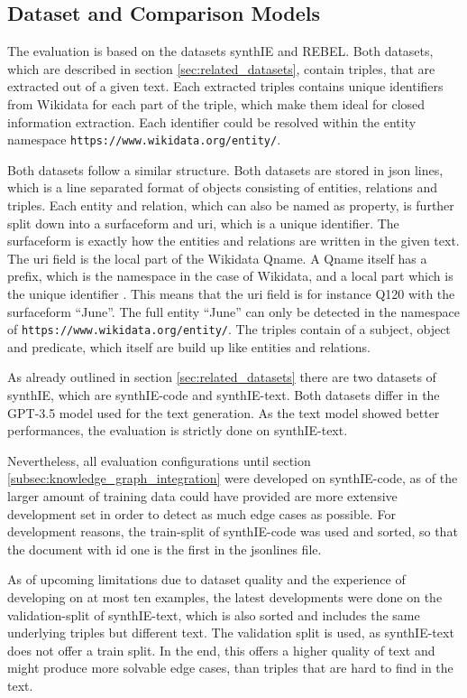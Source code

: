 \documentclass[a4paper,oneside,bibliography=totoc]{scrbook}
\begin{document}
\subsection{Dataset and Comparison Models}
\label{sec:dataset}

The evaluation is based on the datasets synthIE and REBEL. Both datasets, which are described in section \ref{sec:related_datasets}, contain triples, that are extracted out of a given text. Each extracted triples contains unique identifiers from Wikidata for each part of the triple, which make them ideal for closed information extraction. Each identifier could be resolved within the entity namespace \texttt{https://www.wikidata.org/entity/}.

Both datasets follow a similar structure. Both datasets are stored in json lines, which is a line separated format of objects consisting of entities, relations and triples. Each entity and relation, which can also be named as property, is further split down into a surfaceform and uri, which is a unique identifier. The surfaceform is exactly how the entities and relations are written in the given text. The uri field is the local part of the Wikidata Qname. A Qname itself has a prefix, which is the namespace in the case of Wikidata, and a local part which is the unique identifier \cite{ASF2010}. This means that the uri field is for instance Q120 with the surfaceform \enquote{June}. The full entity \enquote{June} can only be detected in the namespace of \texttt{https://www.wikidata.org/entity/}. The triples contain of a subject, object and predicate, which itself are build up like entities and relations.

As already outlined in section \ref{sec:related_datasets} there are two datasets of synthIE, which are synthIE-code and synthIE-text. Both datasets differ in the GPT-3.5 model used for the text generation. As the text model showed better performances, the evaluation is strictly done on synthIE-text.

Nevertheless, all evaluation configurations until section \ref{subsec:knowledge_graph_integration} were developed on synthIE-code, as of the larger amount of training data could have provided are more extensive development set in order to detect as much edge cases as possible. For development reasons, the train-split of synthIE-code was used and sorted, so that the document with id one is the first in the jsonlines file.

As of upcoming limitations due to dataset quality and the experience of developing on at most ten examples, the latest developments were done on the validation-split of synthIE-text, which is also sorted and includes the same underlying triples but different text. The validation split is used, as synthIE-text does not offer a train split. In the end, this offers a higher quality of text and might produce more solvable edge cases, than triples that are hard to find in the text.
\end{document}
